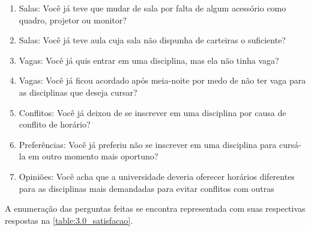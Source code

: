 \begin{apendicesenv}
  \begin{enumerate}
    \item Salas: Você já teve que mudar de sala por falta de algum acessório como quadro, projetor ou monitor? %
    \item Salas: Você já teve aula cuja sala não dispunha de carteiras o suficiente? %
    \item Vagas: Você já quis entrar em uma disciplina, mas ela não tinha vaga? %
    \item Vagas: Você já ficou acordado após meia-noite por medo de não ter vaga para as disciplinas que deseja cursar? %
    \item Conflitos: Você já deixou de se inscrever em uma disciplina por causa de conflito de horário? %
    \item Preferências: Você já preferiu não se inscrever em uma disciplina para cursá-la em outro momento mais oportuno? %
    \item Opiniões: Você acha que a universidade deveria oferecer horários diferentes para as disciplinas mais demandadas para evitar conflitos com outras  %
  \end{enumerate}

  A enumeração das perguntas feitas se encontra representada com suas respectivas respostas na \autoref{table:3.0_satisfacao}.


\end{apendicesenv}

